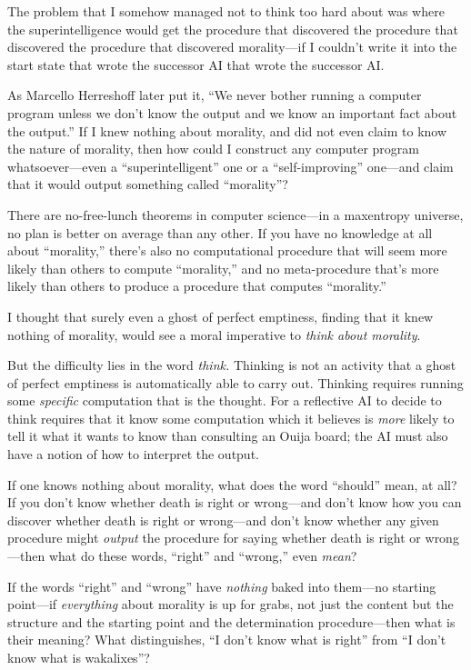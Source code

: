 {
 The problem that I somehow managed not to think too hard about was
where the superintelligence would get the procedure that discovered the
procedure that discovered the procedure that discovered morality---if I
couldn't write it into the start state that wrote the
successor AI that wrote the successor AI.}

{
 As Marcello Herreshoff later put it, ``We never
bother running a computer program unless we don't know
the output and we know an important fact about the
output.'' If I knew nothing about morality, and did
not even claim to know the nature of morality, then how could I
construct any computer program whatsoever---even a
``superintelligent'' one or a
``self-improving'' one---and claim
that it would output something called
``morality''?}

{
 There are no-free-lunch theorems in computer science---in a
maxentropy universe, no plan is better on average than any other. If
you have no knowledge at all about
``morality,''
there's also no computational procedure that will seem
more likely than others to compute
``morality,'' and no meta-procedure
that's more likely than others to produce a procedure
that computes ``morality.''}

{
 I thought that surely even a ghost of perfect emptiness, finding
that it knew nothing of morality, would see a moral imperative to
\textit{think about morality}.}

{
 But the difficulty lies in the word \textit{think.} Thinking is
not an activity that a ghost of perfect emptiness is automatically able
to carry out. Thinking requires running some \textit{specific}
computation that is the thought. For a reflective AI to decide to think
requires that it know some computation which it believes is
\textit{more} likely to tell it what it wants to know than consulting
an Ouija board; the AI must also have a notion of how to interpret the
output.}

{
 If one knows nothing about morality, what does the word
``should'' mean, at all? If you
don't know whether death is right or wrong---and
don't know how you can discover whether death is right
or wrong---and don't know whether any given procedure
might \textit{output} the procedure for saying whether death is right
or wrong---then what do these words,
``right'' and
``wrong,'' even \textit{mean}?}

{
 If the words ``right'' and
``wrong'' have \textit{nothing}
baked into them---no starting point---if \textit{everything} about
morality is up for grabs, not just the content but the structure and
the starting point and the determination procedure---then what is their
meaning? What distinguishes, ``I don't
know what is right'' from ``I
don't know what is wakalixes''?}

